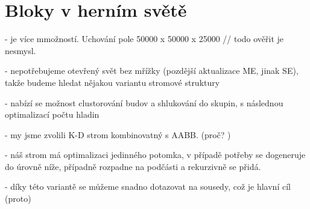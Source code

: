 
\section{Bloky v herním světě}


- je více mmožností. Uchování pole 50000 x 50000 x 25000 // todo ověřit
je nesmysl. 

- nepotřebujeme otevřený svět bez mřížky (pozdější aktualizace ME, jinak SE), takže budeme hledat nějakou variantu stromové struktury

- nabízí se možnost clustorování budov a shlukování do skupin, s následnou optimalizací počtu hladin

- my jsme zvolili K-D strom kombinovatný s AABB. (proč? )

- náš strom  má optimalizaci jedinného potomka, v případě potřeby se dogeneruje do úrovně níže, případně rozpadne na podčásti a rekurzivně se přidá.

- díky této variantě se můžeme snadno dotazovat na sousedy, což je hlavní cíl (proto)

